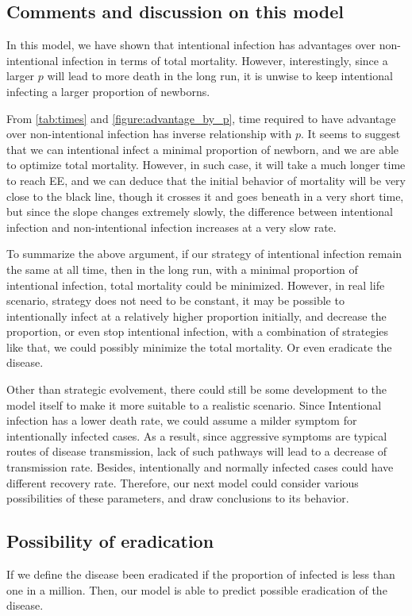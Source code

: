 \documentclass[12pt]{article}
\begin{document}
\subsection{Comments and discussion on this model}

In this model, we have shown that intentional infection has advantages over non-intentional infection in terms of total mortality. However, interestingly, since a larger $p$ will lead to more death in the long run, it is unwise to keep intentional infecting a larger proportion of newborns. 

From \autoref{tab:times} and \autoref{figure:advantage_by_p}, time required to have advantage over non-intentional infection has inverse relationship with $p$. It seems to suggest that we can intentional infect a minimal proportion of newborn, and we are able to optimize total mortality. However, in such case, it will take a much longer time to reach EE, and we can deduce that the initial behavior of mortality will be very close to the black line, though it crosses it and goes beneath in a very short time, but since the slope changes extremely slowly, the difference between intentional infection and non-intentional infection increases at a very slow rate. 

To summarize the above argument, if our strategy of intentional infection remain the same at all time, then in the long run, with a minimal proportion of intentional infection, total mortality could be minimized. However, in real life scenario, strategy does not need to be constant, it may be possible to intentionally infect at a relatively higher proportion initially, and decrease the proportion, or even stop intentional infection, with a combination of strategies like that, we could possibly minimize the total mortality. Or even eradicate the disease.

Other than strategic evolvement, there could still be some development to the model itself to make it more suitable to a realistic scenario. Since Intentional infection has a lower death rate, we could assume a milder symptom for intentionally infected cases. As a result, since aggressive symptoms are typical routes of disease transmission, lack of such pathways will lead to a decrease of transmission rate. Besides, intentionally and normally infected cases could have different recovery rate. Therefore, our next model could consider various possibilities of these parameters, and draw conclusions to its behavior.

\subsection{Possibility of eradication}
If we define the disease been eradicated if the proportion of infected is less than one in a million. Then, our model is able to predict possible eradication of the disease.
\end{document}
